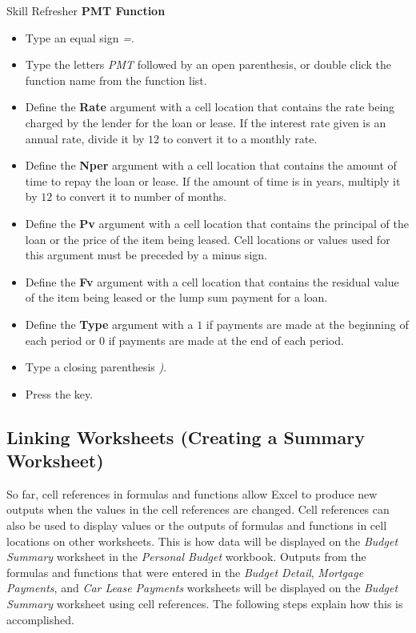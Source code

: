 \begin{center}
	\begin{sklbox}{Skill Refresher}
		\textbf{PMT Function}
		\\
		\begin{itemize}
			\setlength{\itemsep}{0pt}
			\setlength{\parskip}{0pt}
			\setlength{\parsep}{0pt}
			
			\item Type an equal sign \textit{=}.
			\item Type the letters \textit{PMT} followed by an open parenthesis, or double click the function name from the function list.
			\item Define the \textbf{Rate} argument with a cell location that contains the rate being charged by the lender for the loan or lease. If the interest rate given is an annual rate, divide it by $ 12 $ to convert it to a monthly rate.
			\item Define the \textbf{Nper} argument with a cell location that contains the amount of time to repay the loan or lease. If the amount of time is in years, multiply it by $ 12 $ to convert it to number of months.
			\item Define the \textbf{Pv} argument with a cell location that contains the principal of the loan or the price of the item being leased. Cell locations or values used for this argument must be preceded by a minus sign.
			\item Define the \textbf{Fv} argument with a cell location that contains the residual value of the item being leased or the lump sum payment for a loan.
			\item Define the \textbf{Type} argument with a $ 1 $ if payments are made at the beginning of each period or $ 0 $ if payments are made at the end of each period.
			\item Type a closing parenthesis \textit{)}.
			\item Press the  key.
			
		\end{itemize}
	\end{sklbox}
\end{center}

\subsection{Linking Worksheets (Creating a Summary Worksheet)}

So far, cell references in formulas and functions allow Excel to produce new outputs when the values in the cell references are changed. Cell references can also be used to display values or the outputs of formulas and functions in cell locations on other worksheets. This is how data will be displayed on the \textit{Budget Summary} worksheet in the \textit{Personal Budget} workbook. Outputs from the formulas and functions that were entered in the \textit{Budget Detail}, \textit{Mortgage Payments}, and \textit{Car Lease Payments} worksheets will be displayed on the \textit{Budget Summary} worksheet using cell references. The following steps explain how this is accomplished.

